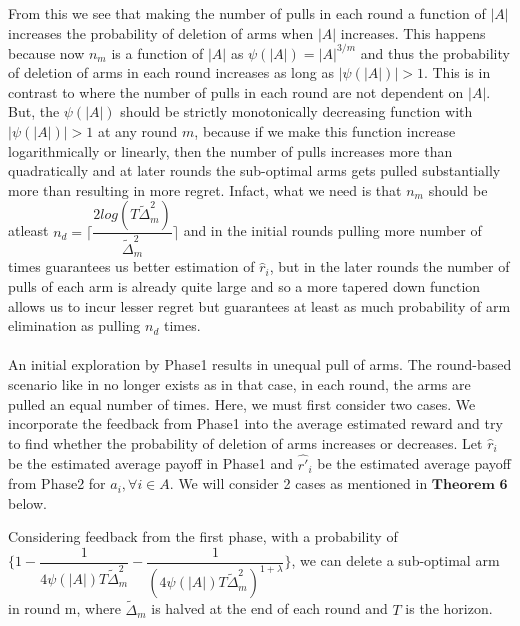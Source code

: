 From this we see that making the number of pulls in each round a function of $|A|$ increases the probability of deletion of arms when $|A|$ increases. This happens because now $n_{m}$ is a function of $|A|$ as $\psi(|A|)=|A|^{3/m}$ and thus the probability of deletion of arms in each round increases as long as $|\psi(|A|)|>1$. This is in contrast to \citep{auer2010ucb} where the number of pulls in each round are not dependent on $|A|$. But, the $\psi(|A|)$ should be strictly monotonically decreasing function with $|\psi(|A|)|>1$ at any round $m$, because if we make this function increase logarithmically or linearly, then the number of pulls increases more than quadratically and at later rounds the sub-optimal arms gets pulled substantially more than \citep{auer2010ucb} resulting in more regret. Infact, what we need is that $n_{m}$ should be atleast $n_{d}=\bigg\lceil \dfrac{2log({T\tilde{\Delta}_{m}^{2}})}{\tilde{\Delta}_{m}^{2}} \bigg\rceil$ and in the initial rounds pulling more number of times guarantees us better estimation of $\hat{r}_{i}$, but in the later rounds the number of pulls of each arm is already quite large and so a more tapered down function allows us to incur lesser regret but guarantees at least as much probability of arm elimination as pulling $n_{d}$ times. 

\paragraph*{} An initial exploration by Phase1 results in unequal pull of arms. The round-based scenario like in \citep{auer2010ucb} no longer exists as in that case, in each round, the arms are pulled an equal number of times. Here, we must first consider two cases. We incorporate the feedback from Phase1 into the average estimated reward and try to find whether the probability of deletion of arms increases or decreases. Let $\hat{r}_{i}$ be the estimated average payoff in Phase1 and $\hat{r'}_{i}$ be the estimated average payoff from Phase2 for $a_{i}, \forall i \in A$. We will consider 2 cases as mentioned in $\textbf{Theorem 6}$ below.

\begin{theorem}
Considering feedback from the first phase, with a probability of  $\bigg\lbrace 1-\dfrac{1}{4\psi(|A|)T\tilde{\Delta}_{m}^{2}} - \dfrac{1}{(4\psi(|A|)T\tilde{\Delta}_{m}^{2})^{1+\lambda}}\bigg\rbrace$,  we can delete a sub-optimal arm in round m, where $\tilde{\Delta}_{m}$ is halved at the end of each round  and $T$ is the horizon. 
\end{theorem}

